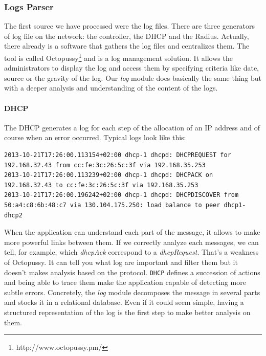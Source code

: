 \subsubsection{Logs Parser}
The first source we have processed were the log files. There are three generators of log file on the network: the controller, the DHCP and the Radius. Actually, there already is a software that gathers the log files and centralizes them. The tool is called Octopussy\footnote{http://www.octopussy.pm/} and is a log management solution. It allows the administrators to display the log and access them by specifying criteria like date, source or the gravity of the log. Our \emph{log} module does basically the same thing but with a deeper analysis and understanding of the content of the logs. 
\paragraph{DHCP}
The DHCP generates a log for each step of the allocation of an IP address and of course when an error occurred. Typical logs look like this:
\begin{lstlisting}[frame=single,breaklines=true,caption={\texttt{DHCP} logs}]
2013-10-21T17:26:00.113154+02:00 dhcp-1 dhcpd: DHCPREQUEST for 192.168.32.43 from cc:fe:3c:26:5c:3f via 192.168.35.253
2013-10-21T17:26:00.113239+02:00 dhcp-1 dhcpd: DHCPACK on 192.168.32.43 to cc:fe:3c:26:5c:3f via 192.168.35.253
2013-10-21T17:26:00.196242+02:00 dhcp-1 dhcpd: DHCPDISCOVER from 50:a4:c8:6b:48:c7 via 130.104.175.250: load balance to peer dhcp1-dhcp2
\end{lstlisting}
When the application can understand each part of the message, it allows to make more powerful links between them. If we correctly analyze each messages, we can tell, for example, which \emph{dhcpAck} correspond to a \emph{dhcpRequest}. That's a weakness of Octopussy. It can tell you what log are important and filter them but it doesn't makes analysis based on the protocol. \texttt{DHCP} defines a succession of actions and being able to trace them make the application capable of detecting more subtle errors. Concretely, the \emph{log} module decomposes the message in several parts and stocks it in a relational database. Even if it could seem simple, having a structured representation of the log is the first step to make better analysis on them.

